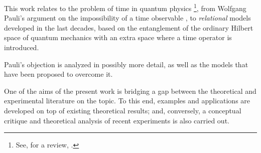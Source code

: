 This work relates to the problem of time in quantum physics%
\footnote{
  See, for a review, \cite{TQM1, TQM2}.
},
from Wolfgang Pauli's argument
on the impossibility of a time observable \parencite{PauliFootnote},
to \emph{relational} models developed in the last decades,
based
on the entanglement of the ordinary Hilbert space of quantum mechanics
with an extra space where a time operator is introduced.

Pauli's objection is analyzed in possibly more detail, as well as the models
that have been proposed
to overcome it. 

One of the aims of the present work
is bridging a gap between the theoretical
and experimental literature on the topic.
To this end, examples and applications are developed on top of existing theoretical results;
and, conversely,
a conceptual critique and theoretical analysis
of recent experiments is also carried out.
